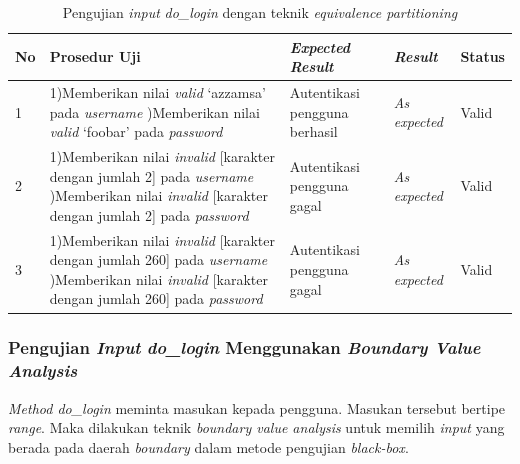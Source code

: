 \begin{longtable}{|P{.06\textwidth}|P{.30\textwidth}|P{.30\textwidth}|P{.10\textwidth}|P{.08\textwidth}|}
  \caption{Pengujian  \emph{input} \emph{do\_login} dengan teknik \emph{equivalence partitioning}} \label{jalur:login-eq}\\
  \hline
  \textbf{No} & \textbf{Prosedur Uji} & \textbf{\emph{Expected Result}} & \textbf{\emph{Result}} & \textbf{Status} \\\hline
  1 & 1)Memberikan nilai \emph{valid} `azzamsa' pada \emph{username} )Memberikan nilai \emph{valid} `foobar' pada \emph{password}
                                      & Autentikasi pengguna berhasil
                                                                        & \emph{As expected} & Valid \\\hline
  2 & 1)Memberikan nilai \emph{invalid} [karakter dengan jumlah 2] pada \emph{username} )Memberikan nilai \emph{invalid} [karakter dengan jumlah 2] pada \emph{password}
                                      & Autentikasi pengguna gagal
                                                                        & \emph{As expected} & Valid \\\hline
  3 & 1)Memberikan nilai \emph{invalid} [karakter dengan jumlah 260] pada \emph{username} )Memberikan nilai \emph{invalid} [karakter dengan jumlah 260] pada \emph{password}
                                      & Autentikasi pengguna gagal
                                                                        & \emph{As expected} & Valid \\\hline
\end{longtable}

\subsubsection{Pengujian \emph{Input} \emph{do\_login} Menggunakan \emph{Boundary Value Analysis}}

\emph{Method do\_login} meminta masukan kepada pengguna. Masukan
tersebut bertipe \emph{range}. Maka dilakukan teknik \emph{boundary
  value analysis} untuk memilih \emph{input} yang berada pada daerah
\emph{boundary} dalam metode pengujian \emph{black-box}. \\

